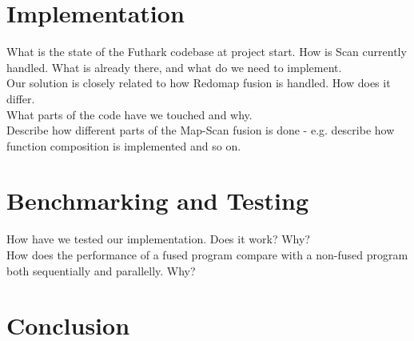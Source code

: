\documentclass[11pt]{article}
\begin{document}
\section{Implementation}

What is the state of the Futhark codebase at project start. How is Scan currently handled. What is already there, and what do we need to implement.\\
Our solution is closely related to how Redomap fusion is handled. How does it differ.\\
What parts of the code have we touched and why.\\
Describe how different parts of the Map-Scan fusion is done - e.g. describe how function composition is implemented and so on.


\section{Benchmarking and Testing}
How have we tested our implementation. Does it work? Why?\\
How does the performance of a fused program compare with a non-fused program both sequentially and parallelly. Why?

\section{Conclusion}
\newpage



\end{document}
